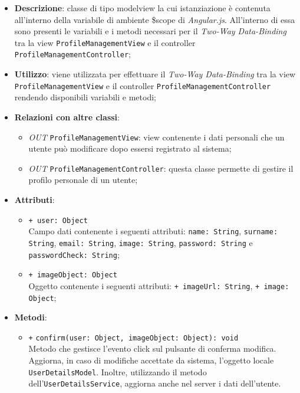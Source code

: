 	\begin{itemize}
		\item \textbf{Descrizione}: classe di tipo modelview la cui istanziazione è contenuta all'interno della variabile di ambiente \$scope di \textit{Angular.js}. All'interno di essa sono presenti le variabili e i metodi necessari per il \textit{Two-Way Data-Binding} tra la view \texttt{ProfileManagementView} e il controller \texttt{ProfileManagementController};
		\item \textbf{Utilizzo}: viene utilizzata per effettuare il \textit{Two-Way Data-Binding} tra la view \texttt{ProfileManagementView} e il controller \texttt{ProfileManagementController} rendendo disponibili variabili e metodi;
		\item \textbf{Relazioni con altre classi}: 
		\begin{itemize}
			\item \textit{OUT} \texttt{ProfileManagementView}: view contenente i dati personali che un utente può modificare dopo essersi registrato al sistema; 
			\item \textit{OUT} \texttt{ProfileManagementController}: questa classe permette di gestire il profilo personale di un utente;
		\end{itemize}
		\item \textbf{Attributi}: 
		\begin{itemize}
			\item \texttt{+ user: Object} \\ Campo dati contenente i seguenti attributi: \texttt{name: String}, \texttt{surname: String}, \texttt{email: String}, \texttt{image: String}, \texttt{password: String} e \texttt{passwordCheck: String};
			\item \texttt{+ imageObject: Object} \\ Oggetto contenente i seguenti attributi: \texttt{+ imageUrl: String}, \texttt{+ image: Object};
		\end{itemize}
		\item \textbf{Metodi}: 
		\begin{itemize}
			\item \texttt{+} \texttt{confirm(user: Object, imageObject: Object): void} \\
			Metodo che gestisce l’evento click sul pulsante di conferma modifica. Aggiorna, in caso di modifiche accettate da sistema, l'oggetto locale \texttt{UserDetailsModel}. Inoltre, utilizzando il metodo dell'\texttt{UserDetailsService}, aggiorna anche nel server i dati dell'utente.
		\end{itemize}
	\end{itemize}	

